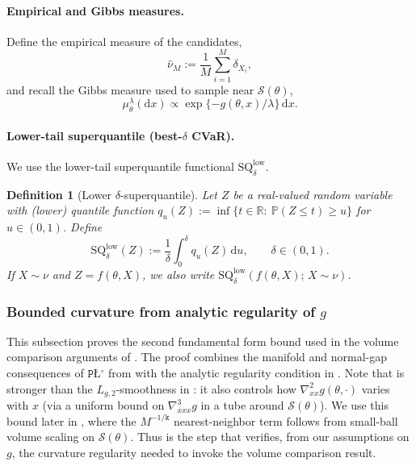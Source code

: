 \documentclass{article}
\def\d{\delta}
\theoremstyle{normaltheorem}
\newtheorem{definition}[definition]{Definition}
\newcommand{\gibbs}{\mu}
\newcommand{\PLcirc}{\texttt{P\L$^\circ$}}
\newcommand{\dimk}{\texttt{k}}
\newcommand{\R}{\mathbb{R}}
\newcommand{\calS}{\mathcal{S}}
\renewcommand{\d}{\mathrm{d}}
\begin{document}
\paragraph{Empirical and Gibbs measures.}
Define the empirical measure of the candidates,
\[
\widehat\nu_M := \frac1M\sum_{i=1}^M \delta_{X_i},
\]
and recall the Gibbs measure used to sample near $\calS(\theta)$,
\[
\gibbs_\theta^\lambda(\d x)\propto \exp\{-g(\theta,x)/\lambda\}\,\d x.
\]

\paragraph{Lower-tail superquantile (best-$\delta$ CVaR).}
We use the lower-tail superquantile functional $\mathrm{SQ}^{\mathrm{low}}_\delta$.

\begin{definition}[Lower $\delta$-superquantile]\label{def:lower-sq}
Let $Z$ be a real-valued random variable with (lower) quantile function
$q_u(Z):=\inf\{t\in\R:\ \mathbb{P}(Z\le t)\ge u\}$ for $u\in(0,1)$.
Define
\[
\mathrm{SQ}^{\mathrm{low}}_\delta(Z):=\frac1\delta\int_0^\delta q_u(Z)\,\d u,
\qquad \delta\in(0,1).
\]
If $X\sim \nu$ and $Z=f(\theta,X)$, we also write
$\mathrm{SQ}^{\mathrm{low}}_\delta(f(\theta,X);\,X\sim\nu)$.
\end{definition}


\subsubsection[Bounded curvature from analytic regularity of g]{Bounded curvature from analytic regularity of $g$}\label{append:curvature-from-g}
\noindent
This subsection proves the second fundamental form bound used in the volume comparison arguments of
\citep[e.g., Lem.~4.1]{masiha2025superquantile}. The proof combines the manifold and normal-gap consequences of
\(\PLcirc\) from  with the analytic regularity condition in .
Note that  is stronger than the $L_{g,2}$-smoothness in :
it also controls how $\nabla^2_{xx}g(\theta,\cdot)$ varies with $x$ (via a uniform bound on $\nabla^3_{xxx}g$ in a tube around $\calS(\theta)$).
We use this bound later in , where the \(M^{-1/\dimk}\) nearest-neighbor term follows from
small-ball volume scaling on \(\calS(\theta)\). Thus  is the step that verifies, from our
assumptions on \(g\), the curvature regularity needed to invoke the volume comparison result.
\end{document}
